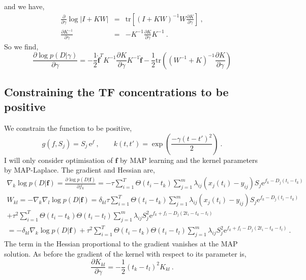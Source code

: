 \documentclass[10pt]{article}
\begin{document}
and we have,
\begin{eqnarray*}
\frac{\partial}{\partial \gamma}\log|I+KW| & = & \mbox{tr}\left[
  (I+KW)^{-1}W\frac{\partial K}{\partial \gamma}\right] \ , \\
\frac{\partial K^{-1}}{\partial \gamma} & = & -K^{-1}\frac{\partial
  K}{\partial \gamma}K^{-1} \ .
\end{eqnarray*}
So we find,
\begin{equation}
\frac{\partial \log p(D|\gamma)}{\partial \gamma} =
-\mbox{$\frac{1}{2}$}\hat{\bm f}^T K^{-1}\frac{\partial K}{\partial \gamma} K^{-1}\hat{\bm f} - 
\mbox{$\frac{1}{2}$}\mbox{tr}\left((W^{-1}+K)^{-1}\frac{\partial
  K}{\partial \gamma}\right) 
\end{equation}

\subsection{Constraining the TF concentrations to be positive}
We constrain the function to be positive,
\begin{equation}
g(f,S_j) = S_j \, \mathrm{e}^f \ , \qquad k(t,t')  =
\exp\left(\frac{-\gamma(t-t')^2}{2} \right) \ .
\end{equation}
I will only consider optimisation of $\bm f$ by MAP learning and the
kernel parameters by MAP-Laplace. The gradient and Hessian are,
\begin{eqnarray}
\nabla_k \log p(D|\bm f) = \frac{\partial \log p(D|\bm
  f)}{\partial f_k} = -\tau\sum_{i=1}^T \Theta(t_i - t_k)\sum_{j=1}^m \lambda_{ij} 
(x_j(t_i) - y_{ij})S_j \mathrm{e}^{f_k-D_j(t_i-t_k)} \\
W_{kl} = -\nabla_k \nabla_l \log p(D|\bm f) = \delta_{kl} \tau \sum_{i=1}^T
  \Theta(t_i-t_k)\sum_{j=1}^m \lambda_{ij} 
(x_j(t_i) - y_{ij})S_j \mathrm{e}^{f_k-D_j(t_i-t_k)}  \nonumber \\
+ \tau^2\sum_{i=1}^T \Theta(t_i-t_k)\Theta(t_i-t_l)\sum_{j=1}^m \lambda_{ij} 
S_j^2 \mathrm{e}^{f_k+f_l-D_j(2t_i-t_k-t_l)} \nonumber \\
= -\delta_{kl}\nabla_k \log p(D|\bm f) + \tau^2\sum_{i=1}^T \Theta(t_i-t_k)\Theta(t_i-t_l)\sum_{j=1}^m \lambda_{ij} 
S_j^2 \mathrm{e}^{f_k+f_l-D_j(2t_i-t_k-t_l)} \label{eqn_hessian_pos} \ .
\end{eqnarray}
The term in the Hessian proportional to the gradient vanishes at the
MAP solution. As before the gradient of the kernel with respect to its parameter is,
\begin{equation}
\frac{\partial K_{kl}}{\partial \gamma} =
-\mbox{$\frac{1}{2}$}(t_k-t_l)^2K_{kl} \ .
\end{equation}
\end{document}
